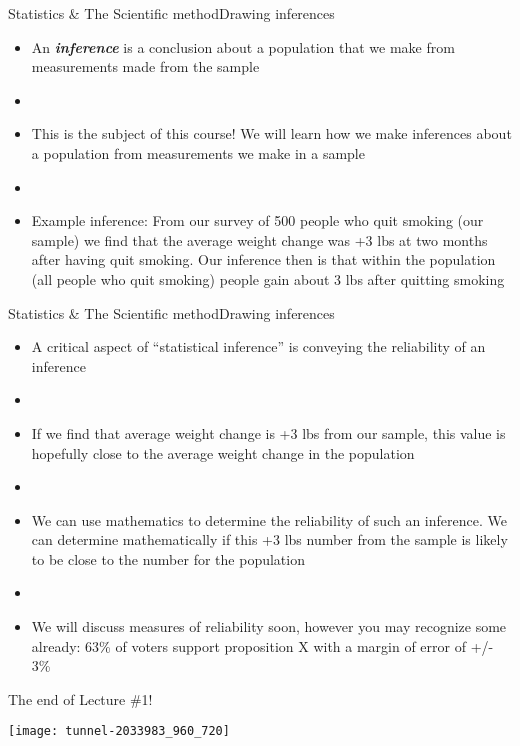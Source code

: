 \documentclass[xcolor=dvipsnames]{beamer}
\begin{document}
\begin{frame}{Statistics \& The Scientific method}{Drawing inferences}
	\begin{itemize}
		\item An \textbf{\emph{inference}} is a conclusion about a population that we make from measurements made from the sample  \pause
		\item[]
		\item This is the subject of this course! We will learn how we make inferences about a population from measurements we make in a sample \pause
		\item[]
		\item Example inference: From our survey of 500 people who quit smoking (our sample) we find that the average weight change was +3 lbs at two months after having quit smoking. Our inference then is that within the population (all people who quit smoking) people gain about 3 lbs after quitting smoking 
	\end{itemize}
\end{frame}

\begin{frame}{Statistics \& The Scientific method}{Drawing inferences}
	\begin{itemize}
		\item A critical aspect of ``statistical inference'' is conveying the reliability of an inference \pause
		\item[]
		\item If we find that average weight change is +3 lbs from our sample, this value is hopefully close to the average weight change in the population \pause
		\item[]
		\item We can use mathematics to determine the reliability of such an inference. We can determine mathematically if this +3 lbs number from the sample is likely to be close to the number for the population \pause
		\item[]
		\item We will discuss measures of reliability soon, however you may recognize some already: 63\% of voters support proposition X with a margin of error of +/- 3\%
	\end{itemize}
\end{frame}

\begin{frame}{The end of Lecture \#1!}
	\begin{center}
		\texttt{[image: tunnel-2033983\_960\_720]}
	\end{center}
\end{frame}
\end{document}
